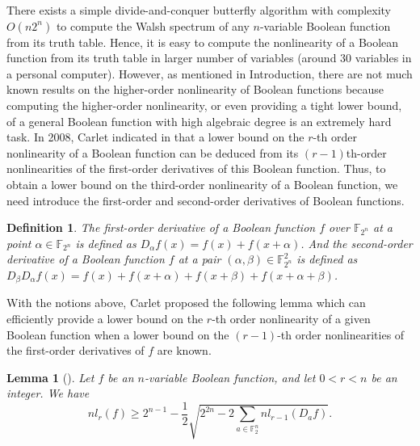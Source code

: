 \documentclass{article}
\newcommand{\F}{\mathbb{F}}
\newcommand{\0}{\textbf{0}}
\newcommand{\1}{\textbf{1}}
\theoremstyle{plain}
\newtheorem{lemma}{Lemma}
\newtheorem{definition}{Definition}
\begin{document}
    There exists a simple divide-and-conquer butterfly algorithm with complexity $O(n2^n)$ to compute the Walsh spectrum of any $n$-variable Boolean function from its truth table.
    Hence, it is easy to compute the nonlinearity of a Boolean function from its truth table in larger number of variables (around $30$ variables in a personal computer).
    However, as mentioned in Introduction, there are not much known results on the higher-order nonlinearity of Boolean functions because computing the higher-order nonlinearity, or even providing a tight lower bound, of a general Boolean function with high algebraic degree is an extremely hard task.
    In 2008, Carlet indicated in \cite{Carlet2008lowbound_NL_profile} that a lower bound on the $r$-th order nonlinearity of a Boolean function can be deduced from its $(r-1)$th-order nonlinearities of the first-order derivatives of this Boolean function.
    Thus, to obtain a lower bound on the third-order nonlinearity of a Boolean function, we need introduce the first-order and second-order derivatives of Boolean functions.
    \begin{definition}
        The first-order derivative of a Boolean function $f$ over $\F_{2^n}$ at a point $\alpha\in\F_{2^n}$ is defined as $D_{\alpha}f(x)=f(x)+f(x+\alpha)$.
        And the second-order derivative of a Boolean function $f$ at a pair $(\alpha,\beta)\in\F_{2^n}^2$ is defined as $D_{\beta}D_{\alpha}f(x)=f(x)+f(x+\alpha)+f(x+\beta)+f(x+\alpha+\beta)$.
    \end{definition}
    With the notions above, Carlet proposed the following lemma which can efficiently provide a lower bound on the $r$-th order nonlinearity of a given Boolean function when a lower bound on the $(r-1)$-th order nonlinearities of the first-order derivatives of $f$ are known.
    \begin{lemma}[\cite{Carlet2008lowbound_NL_profile}]\label{thm:High_order_nl_bound1}
        Let $f$ be an $n$-variable Boolean function, and let $0<r<n$ be an integer.
        We have
        \[nl_r(f)\ge 2^{n-1}-\frac{1}{2}\sqrt{2^{2n}-2\sum_{a\in\F_2^n}nl_{r-1}(D_af)}.\]
    \end{lemma}
\end{document}

